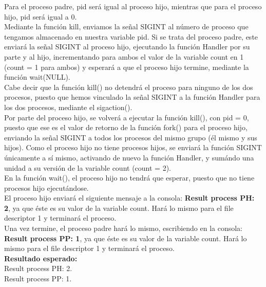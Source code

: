 \documentclass[spanish]{article}
\begin{document}
Para el proceso padre, pid será igual al proceso hijo,
mientras que para el proceso hijo, pid será igual a 0.\\

Mediante la función kill, enviamos la señal SIGINT al número
de proceso que tengamos almacenado en nuestra variable pid.
Si se trata del proceso padre, este enviará la señal SIGINT
al proceso hijo, ejecutando la función Handler por su parte
y al hijo, incrementando para ambos el valor de la variable
count en 1 (count = 1 para ambos) y esperará a que el
proceso hijo termine, mediante la función wait(NULL).\\

Cabe decir que la función kill() no detendrá el proceso para
ninguno de los dos procesos, puesto que hemos vinculado la
señal SIGINT a la función Handler para los dos procesos,
mediante el sigaction().\\

Por parte del proceso hijo, se volverá a ejecutar la función
kill(), con pid = 0, puesto que ese es el valor de retorno
de la función fork() para el proceso hijo, enviando la señal
SIGINT a todos los procesos del mismo grupo (él mismo y sus
hijos). Como el proceso hijo no tiene procesos hijos, se
enviará la función SIGINT únicamente a sí mismo, activando
de nuevo la función Handler, y sumándo una unidad a su
versión de la variable count (count = 2).\\

En la función wait(), el proceso hijo no tendrá que esperar,
puesto que no tiene procesos hijo ejecutándose.\\

El proceso hijo enviará el siguiente mensaje a la consola:
\textbf{Result process PH: 2}, ya que éste es su valor de la
variable count. Hará lo mismo para el file descriptor 1 y
terminará el proceso.\\

Una vez termine, el proceso padre hará lo mismo, escribiendo
en la consola: \textbf{Result process PP: 1}, ya que éste es
su valor de la variable count. Hará lo mismo para el file
descriptor 1 y terminará el proceso.\\

\textbf{Resultado esperado:}\\

Result process PH: 2.\\

Result process PP: 1.\\
\end{document}
